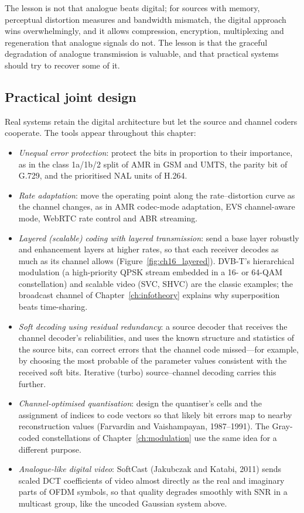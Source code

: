 The lesson is not that analogue beats digital; for sources with memory, perceptual distortion measures and
bandwidth mismatch, the digital approach wins overwhelmingly, and it allows compression, encryption,
multiplexing and regeneration that analogue signals do not. The lesson is that the graceful degradation of
analogue transmission is valuable, and that practical systems should try to recover some of it.

\subsection{Practical joint design}

Real systems retain the digital architecture but let the source and channel coders cooperate. The tools
appear throughout this chapter:
\begin{itemize}[nosep]
\item \emph{Unequal error protection}: protect the bits in proportion to their importance, as in the class
1a/1b/2 split of AMR in GSM and UMTS, the parity bit of G.729, and the prioritised NAL units of H.264.
\item \emph{Rate adaptation}: move the operating point along the rate--distortion curve as the channel
changes, as in AMR codec-mode adaptation, EVS channel-aware mode, WebRTC rate control and ABR streaming.
\item \emph{Layered (scalable) coding with layered transmission}: send a base layer robustly and
enhancement layers at higher rates, so that each receiver decodes as much as its channel allows (Figure~\ref{fig:ch16_layered}). DVB-T's
hierarchical modulation (a high-priority QPSK stream embedded in a 16- or 64-QAM constellation) and scalable
video (SVC, SHVC) are the classic examples; the broadcast channel of Chapter~\ref{ch:infotheory} explains
why superposition beats time-sharing.
\item \emph{Soft decoding using residual redundancy}: a source decoder that receives the channel decoder's
reliabilities, and uses the known structure and statistics of the source bits, can correct errors that the
channel code missed---for example, by choosing the most probable of the parameter values consistent with the
received soft bits. Iterative (turbo) source--channel decoding carries this further.
\item \emph{Channel-optimised quantisation}: design the quantiser's cells and the assignment of indices to
code vectors so that likely bit errors map to nearby reconstruction values (Farvardin and Vaishampayan,
1987--1991). The Gray-coded constellations of Chapter~\ref{ch:modulation} use the same idea for a different
purpose.
\item \emph{Analogue-like digital video}: SoftCast (Jakubczak and Katabi, 2011) sends scaled DCT coefficients
of video almost directly as the real and imaginary parts of OFDM symbols, so that quality degrades smoothly
with SNR in a multicast group, like the uncoded Gaussian system above.
\end{itemize}



